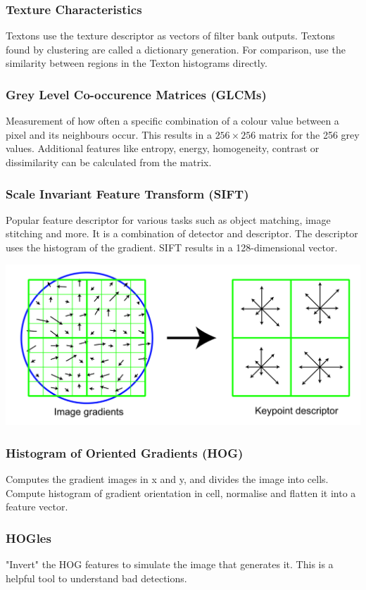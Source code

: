 \documentclass[x11names,11pt,a4paper]{article}
\theoremstyle{definition}
\begin{document}
\subsubsection{Texture Characteristics}
Textons use the texture descriptor as vectors of filter bank outputs. Textons found by clustering are called a dictionary generation. For comparison, use the similarity between regions in the Texton histograms directly.

\subsubsection{Grey Level Co-occurence Matrices (GLCMs)}
Measurement of how often a specific combination of a colour value between a pixel and its neighbours occur. This results in a $256\times 256$ matrix for the 256 grey values. Additional features like entropy, energy, homogeneity, contrast or dissimilarity can be calculated from the matrix.

\subsubsection{Scale Invariant Feature Transform (SIFT)}
Popular feature descriptor for various tasks such as object matching, image stitching and more. It is a combination of detector and descriptor. The descriptor uses the histogram of the gradient. SIFT results in a 128-dimensional vector.
\begin{center}
	\includegraphics[width=0.6\linewidth]{img/SIFT}
\end{center}

\subsubsection{Histogram of Oriented Gradients (HOG)}
Computes the gradient images in x and y, and divides the image into cells. Compute histogram of gradient orientation in cell, normalise and flatten it into a feature vector.

\subsubsection{HOGles}
"Invert" the HOG features to simulate the image that generates it. This is a helpful tool to understand bad detections.
\end{document}
